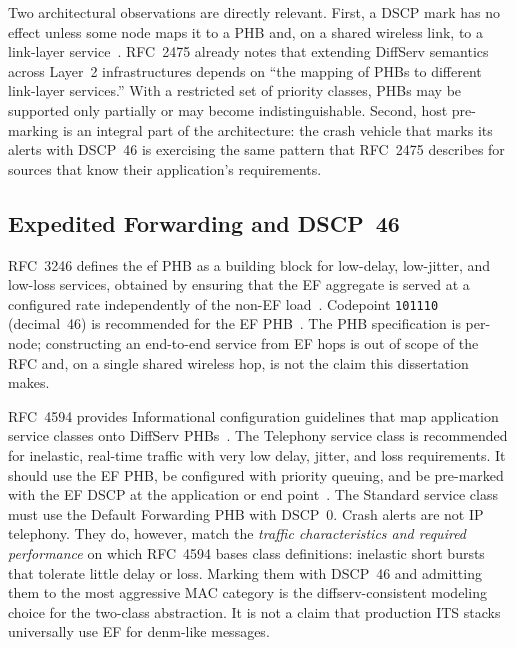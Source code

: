 Two architectural observations are directly relevant.
First, a DSCP mark has no effect unless some node maps it to a PHB and, on a shared wireless link, to a link-layer service~\cite{RFC2475_DiffServ_Architecture}.
RFC~2475 already notes that extending DiffServ semantics across Layer~2 infrastructures depends on ``the mapping of PHBs to different link-layer services.''
With a restricted set of priority classes, PHBs may be supported only partially or may become indistinguishable.
Second, host pre-marking is an integral part of the architecture: the crash vehicle that marks its alerts with DSCP~46 is exercising the same pattern that RFC~2475 describes for sources that know their application's requirements.

\subsection{Expedited Forwarding and DSCP~46}
\label{sec:bg:ef}

RFC~3246 defines the \gls{ef} PHB as a building block for low-delay, low-jitter, and low-loss services, obtained by ensuring that the EF aggregate is served at a configured rate independently of the non-EF load~\cite{RFC3246_EF_PHB}.
Codepoint \texttt{101110} (decimal~46) is recommended for the EF PHB~\cite{RFC3246_EF_PHB}.
The PHB specification is per-node; constructing an end-to-end service from EF hops is out of scope of the RFC and, on a single shared wireless hop, is not the claim this dissertation makes.

RFC~4594 provides Informational configuration guidelines that map application service classes onto DiffServ PHBs~\cite{RFC4594_DiffServ_Service_Classes}.
The Telephony service class is recommended for inelastic, real-time traffic with very low delay, jitter, and loss requirements.
It should use the EF PHB, be configured with priority queuing, and be pre-marked with the EF DSCP at the application or end point~\cite{RFC4594_DiffServ_Service_Classes}.
The Standard service class must use the Default Forwarding PHB with DSCP~0.
Crash alerts are not IP telephony.
They do, however, match the \emph{traffic characteristics and required performance} on which RFC~4594 bases class definitions: inelastic short bursts that tolerate little delay or loss.
Marking them with DSCP~46 and admitting them to the most aggressive MAC category is the \gls{diffserv}-consistent modeling choice for the two-class abstraction.
It is not a claim that production ITS stacks universally use EF for \gls{denm}-like messages.

